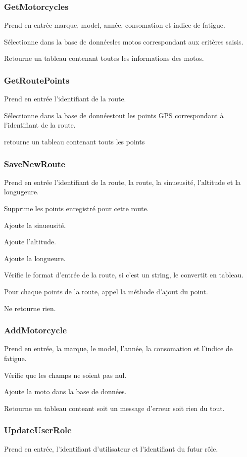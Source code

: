\documentclass[a4paper]{article}
\newcommand{\bdd}{base de données}
\begin{document}
\subsubsection{GetMotorcycles}
Prend en entrée marque, model, année, consomation et indice de fatigue.

Sélectionne dans la \bdd les motos correspondant aux critères saisis.

Retourne un tableau contenant toutes les informations des motos.

\subsubsection{GetRoutePoints}
Prend en entrée l'identifiant de la route.

Sélectionne dans la \bdd tout les points GPS correspondant à l'identifiant de la route.

retourne un tableau contenant touts les points

\subsubsection{SaveNewRoute}
Prend en entrée l'identifiant de la route, la route, la sinueusité, l'altitude et la longugeure.

Supprime les points enregistré pour cette route.

Ajoute la sinueusité.

Ajoute l'altitude.

Ajoute la longueure.

Vérifie le format d'entrée de la route, si c'est un string, le convertit en tableau.

Pour chaque points de la route, appel la méthode d'ajout du point.

Ne retourne rien.

\subsubsection{AddMotorcycle}
Prend en entrée, la marque, le model, l'année, la consomation et l'indice de fatigue.

Vérifie que les champs ne soient pas nul.

Ajoute la moto dans la \bdd.

Retourne un tableau conteant soit un message d'erreur soit rien du tout.

\subsubsection{UpdateUserRole}
Prend en entrée, l'identifiant d'utilisateur et l'identifiant du futur rôle.
\end{document}
